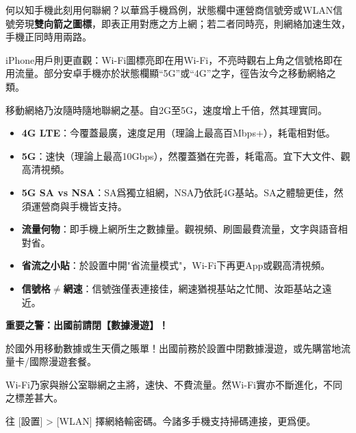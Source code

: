 
何以知手機此刻用何聯網？以華爲手機爲例，狀態欄中運營商信號旁或WLAN信號旁現\textbf{雙向箭之圖標}，即表正用對應之方上網；若二者同時亮，則網絡加速生效，手機正同時用兩路。

iPhone用戶則更直觀：Wi-Fi圖標亮即在用Wi-Fi，不亮時觀右上角之信號格即在用流量。部分安卓手機亦於狀態欄顯“5G”或“4G”之字，徑告汝今之移動網絡之類。


移動網絡乃汝隨時隨地聯網之基。自2G至5G，速度增上千倍，然其理實同。


\begin{itemize}
  \item \textbf{4G LTE}：今覆蓋最廣，速度足用（理論上最高百Mbps+），耗電相對低。
  \item \textbf{5G}：速快（理論上最高10Gbps），然覆蓋猶在完善，耗電高。宜下大文件、觀高清視頻。
  \item \textbf{5G SA vs NSA}：SA爲獨立組網，NSA乃依託4G基站。SA之體驗更佳，然須運營商與手機皆支持。
\end{itemize}


\begin{itemize}
  \item \textbf{流量何物}：即手機上網所生之數據量。觀視頻、刷圖最費流量，文字與語音相對省。
  \item \textbf{省流之小貼}：於設置中開"省流量模式"，Wi-Fi下再更App或觀高清視頻。
  \item \textbf{信號格$\neq$網速}：信號強僅表連接佳，網速猶視基站之忙閒、汝距基站之遠近。
\end{itemize}

\textbf{重要之警：出國前請閉【數據漫遊】！}\par

於國外用移動數據或生天價之賬單！出國前務於設置中閉數據漫遊，或先購當地流量卡/國際漫遊套餐。


Wi-Fi乃家與辦公室聯網之主將，速快、不費流量。然Wi-Fi實亦不斷進化，不同之標差甚大。


往 [設置] > [WLAN] 擇網絡輸密碼。今諸多手機支持掃碼連接，更爲便。


